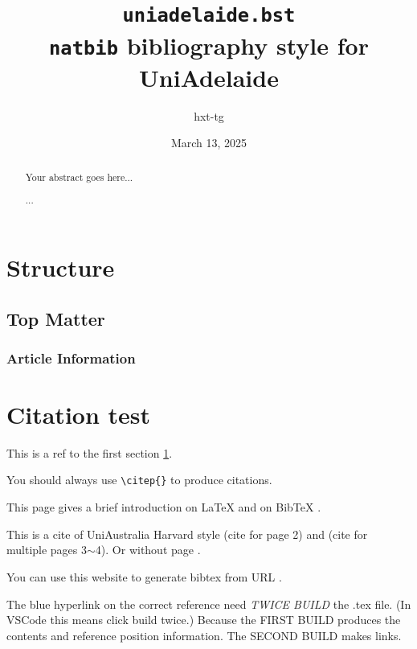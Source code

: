 \documentclass[a4paper]{article}
\title{\texttt{uniadelaide.bst} \\ {\normalsize \texttt{natbib} bibliography style for UniAdelaide}}
\author{hxt-tg}
\date{March 13, 2025}
\begin{document}
\maketitle

\begin{abstract}
    Your abstract goes here...

    ...
\end{abstract}

{\hypersetup{hidelinks} \tableofcontents} %

\section{Structure}
\label{sec:structure}  %

\lipsum[1-2]

\subsection{Top Matter}

\lipsum[3-4]

\subsubsection{Article Information}

\lipsum[5-6]

\section{Citation test}

This is a ref to the first section \ref{sec:structure}. 

You should always use \verb|\citep{}| to produce citations.

This page gives a brief introduction on LaTeX \citep{wikibooksLaTeXDocStruct} and on BibTeX \citep{overleafBibTeX}.

This is a cite of UniAustralia Harvard style \citep[p.~2]{vaswani2017attention} (cite for page 2) and \citep[pp.~3-4]{vaswani2017attention} (cite for multiple pages 3$\sim$4). Or without page \citep{vaswani2017attention}.

You can use this website to generate bibtex from URL \citep{getbibtexBibTeXGenerator}.

The blue hyperlink on the correct reference need \emph{TWICE BUILD} the .tex file. (In VSCode this means click build twice.) Because the FIRST BUILD produces the contents and reference position information. The SECOND BUILD makes links.
\end{document}
